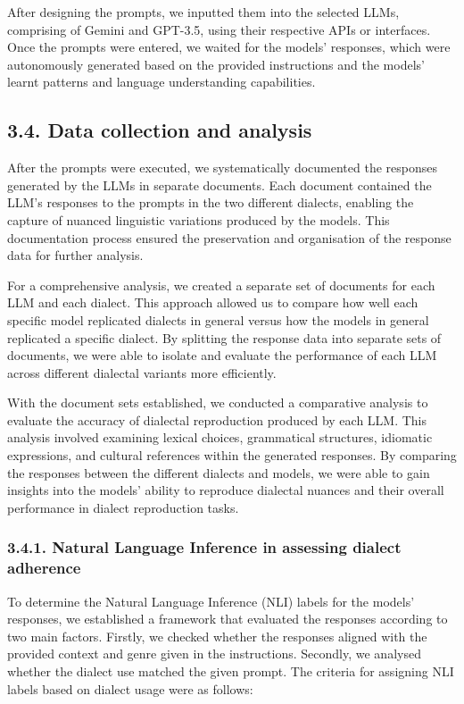 \documentclass[fleqn,moreauthors,10pt]{ds_report}
\begin{document}
    After designing the prompts, we inputted them into the selected LLMs, comprising of Gemini and GPT-3.5, using their respective APIs or interfaces. Once the prompts were entered, we waited for the models' responses, which were autonomously generated  based on the provided instructions and the models' learnt patterns and language understanding capabilities.
    
\subsection{3.4. Data collection and analysis}

    After the prompts were executed, we systematically documented the responses generated by the LLMs in separate documents. Each document contained the LLM's responses to the prompts in the two different dialects, enabling the capture of nuanced linguistic variations produced by the models. This documentation process ensured the preservation and organisation of the response data for further analysis.

    For a comprehensive analysis, we created a separate set of documents for each LLM and each dialect. This approach allowed us to compare how well each specific model replicated dialects in general versus how the models in general replicated a specific dialect. By splitting the response data into separate sets of documents, we were able to isolate and evaluate the performance of each LLM across different dialectal variants more efficiently.

    With the document sets established, we conducted a comparative analysis to evaluate the accuracy of dialectal reproduction produced by each LLM. This analysis involved examining lexical choices, grammatical structures, idiomatic expressions, and cultural references within the generated responses. By comparing the responses between the different dialects and models, we were able to gain insights into the models' ability to reproduce dialectal nuances and their overall performance in dialect reproduction tasks.

\subsubsection{3.4.1. Natural Language Inference in assessing dialect adherence }

    To determine the Natural Language Inference (NLI) labels for the models' responses, we established a framework that evaluated the responses according to two main factors. Firstly, we checked whether the responses aligned with the provided context and genre given in the instructions. Secondly, we analysed whether the dialect use matched the given prompt. The criteria for assigning NLI labels based on dialect usage were as follows:
\end{document}
